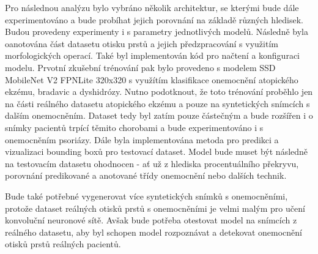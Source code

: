 Pro následnou analýzu bylo vybráno několik architektur, se kterými bude dále experimentováno a bude probíhat jejich porovnání na základě různých hledisek. Budou provedeny experimenty i s parametry jednotlivých modelů. Následně byla oanotována část datasetu otisku prstů a jejich předzpracování s využitím morfologických operací. Také byl implementován kód pro načtení a konfiguraci modelu. Prvotní zkušební trénování pak bylo provedeno s modelem SSD MobileNet V2 FPNLite 320x320 s využítím klasifikace onemocnění atopického ekzému, bradavic a dyshidrózy. Nutno podotknout, že toto trénování proběhlo jen na části reálného datasetu atopického ekzému a pouze na syntetických snímcích s dalším onemocněním. Dataset tedy byl zatím pouze částečným a bude rozšířen i o snímky pacientů trpící těmito chorobami a bude experimentováno i s onemocněním psoriázy. Dále byla implementována metoda pro predikci a vizualizaci bounding boxů pro testovací dataset. Model bude muset být následně na testovacím datasetu ohodnocen - ať už z hlediska procentuálního překryvu, porovnání predikované a anotované třídy onemocnění nebo dalších technik.

Bude také potřebné vygenerovat více syntetických snímků s onemocněními, protože dataset reálných otisků prstů s onemocněními je velmi malým pro učení konvoluční neuronové sítě. Avšak bude potřeba otestovat model na snímcích z reálného datasetu, aby byl schopen model rozpoznávat a detekovat onemocnění otisků prstů reálných pacientů.

